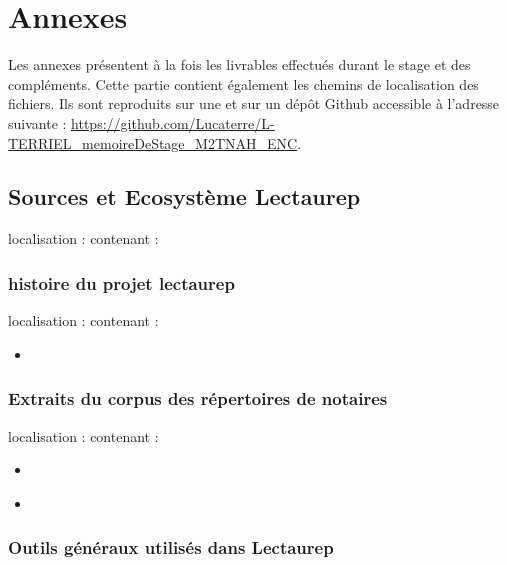 

\appendix
\part*{Annexes}
\pagestyle{myheadings}

Les annexes présentent à la fois les livrables effectués durant le stage et des compléments. Cette partie contient également les chemins de localisation des fichiers. Ils sont reproduits sur une  et sur un dépôt Github accessible à l'adresse suivante : \url{https://github.com/Lucaterre/L-TERRIEL_memoireDeStage_M2TNAH_ENC}.

\chapter{Sources et Ecosystème Lectaurep}

localisation :  contenant :

\section{histoire du projet lectaurep}
localisation :  contenant :
\begin{itemize}
    \item {}
\end{itemize}


\section{Extraits du corpus des répertoires de notaires}
localisation :  contenant :
\begin{itemize}
    \item {}
    \item {} \\
\end{itemize}


\section{Outils généraux utilisés dans Lectaurep}

